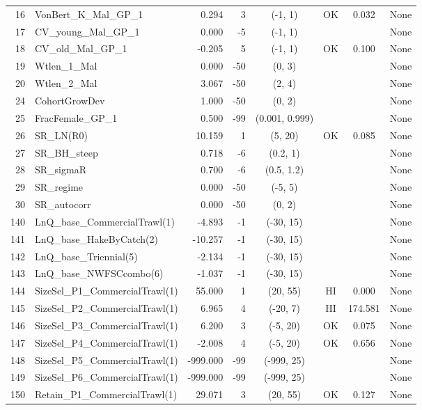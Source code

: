 \documentclass[12pt,]{article}
\begin{document}
\begin{landscape}
\begin{longtable}{rlrrcccl}
  16 & VonBert\_K\_Mal\_GP\_1 & 0.294 & 3 & (-1, 1) & OK & 0.032 & None \\ 
  17 & CV\_young\_Mal\_GP\_1 & 0.000 & -5 & (-1, 1) &  &  & None \\ 
  18 & CV\_old\_Mal\_GP\_1 & -0.205 & 5 & (-1, 1) & OK & 0.100 & None \\ 
  19 & Wtlen\_1\_Mal & 0.000 & -50 & (0, 3) &  &  & None \\ 
  20 & Wtlen\_2\_Mal & 3.067 & -50 & (2, 4) &  &  & None \\ 
  24 & CohortGrowDev & 1.000 & -50 & (0, 2) &  &  & None \\ 
  25 & FracFemale\_GP\_1 & 0.500 & -99 & (0.001, 0.999) &  &  & None \\ 
  26 & SR\_LN(R0) & 10.159 & 1 & (5, 20) & OK & 0.085 & None \\ 
  27 & SR\_BH\_steep & 0.718 & -6 & (0.2, 1) &  &  & None \\ 
  28 & SR\_sigmaR & 0.700 & -6 & (0.5, 1.2) &  &  & None \\ 
  29 & SR\_regime & 0.000 & -50 & (-5, 5) &  &  & None \\ 
  30 & SR\_autocorr & 0.000 & -50 & (0, 2) &  &  & None \\ 
  140 & LnQ\_base\_CommercialTrawl(1) & -4.893 & -1 & (-30, 15) &  &  & None \\ 
  141 & LnQ\_base\_HakeByCatch(2) & -10.257 & -1 & (-30, 15) &  &  & None \\ 
  142 & LnQ\_base\_Triennial(5) & -2.134 & -1 & (-30, 15) &  &  & None \\ 
  143 & LnQ\_base\_NWFSCcombo(6) & -1.037 & -1 & (-30, 15) &  &  & None \\ 
  144 & SizeSel\_P1\_CommercialTrawl(1) & 55.000 & 1 & (20, 55) & HI & 0.000 & None \\ 
  145 & SizeSel\_P2\_CommercialTrawl(1) & 6.965 & 4 & (-20, 7) & HI & 174.581 & None \\ 
  146 & SizeSel\_P3\_CommercialTrawl(1) & 6.200 & 3 & (-5, 20) & OK & 0.075 & None \\ 
  147 & SizeSel\_P4\_CommercialTrawl(1) & -2.008 & 4 & (-5, 20) & OK & 0.656 & None \\ 
  148 & SizeSel\_P5\_CommercialTrawl(1) & -999.000 & -99 & (-999, 25) &  &  & None \\ 
  149 & SizeSel\_P6\_CommercialTrawl(1) & -999.000 & -99 & (-999, 25) &  &  & None \\ 
  150 & Retain\_P1\_CommercialTrawl(1) & 29.071 & 3 & (20, 55) & OK & 0.127 & None \\ 

\end{longtable}
\end{landscape}
\end{document}
